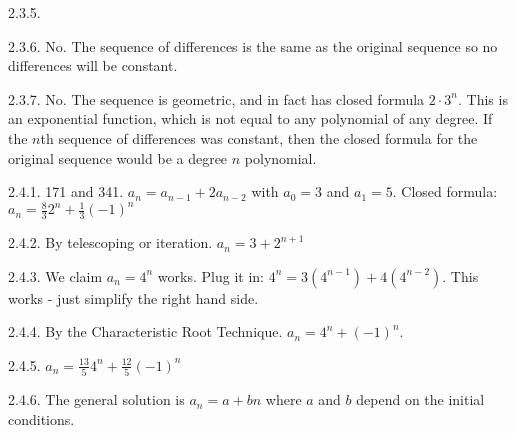 \begin {itemize}
\begin{ans}{2.3.5.}
\end{ans}
\begin{ans}{2.3.6.}
		No.  The sequence of differences is the same as the original sequence so no differences will be constant.
	
\end{ans}
\begin{ans}{2.3.7.}
		No.  The sequence is geometric, and in fact has closed formula $2\cdot 3^n$.  This is an exponential function, which is not equal to any polynomial of any degree.  If the $n$th sequence of differences was constant, then the closed formula for the original sequence would be a degree $n$ polynomial.
	
\end{ans}
\protect \end {itemize}
 \protect {} \protect \begin {itemize} 
\begin{ans}{2.4.1.}
		171 and 341.  $a_n = a_{n-1} + 2a_{n-2}$ with $a_0 = 3$ and $a_1 = 5$.  Closed formula: $a_n = \frac{8}{3}2^n + \frac{1}{3}(-1)^n$
	
\end{ans}
\begin{ans}{2.4.2.}
		By telescoping or iteration.  $a_n = 3 + 2^{n+1}$
	
\end{ans}
\begin{ans}{2.4.3.}
		We claim $a_n = 4^n$ works.  Plug it in: $4^n = 3(4^{n-1}) + 4(4^{n-2})$.  This works - just simplify the right hand side.
	
\end{ans}
\begin{ans}{2.4.4.}
		By the Characteristic Root Technique.  $a_n = 4^n + (-1)^n$.
	
\end{ans}
\begin{ans}{2.4.5.}
		$a_n = \frac{13}{5} 4^n + \frac{12}{5} (-1)^n$
	
\end{ans}
\begin{ans}{2.4.6.}
		The general solution is $a_n = a + bn$ where $a$ and $b$ depend on the initial conditions.  %
\end{ans}
\end{itemize}
